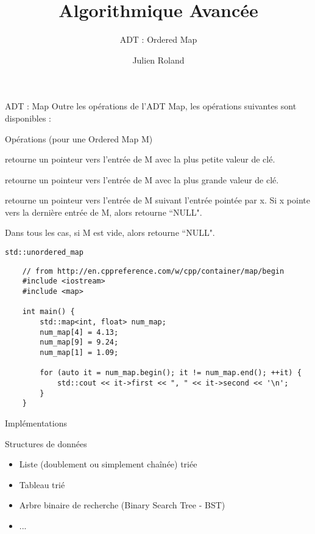 \documentclass{beamer}
\title{Algorithmique Avancée}
\subtitle{ADT : Ordered Map}
\author{Julien Roland}
\newcommand{\Op}[2]{\texttt{\underline{#1}#2}}
\begin{document}
\lstset{language=c++, basicstyle=\small, columns=fullflexible}


\maketitle


\begin{frame}{ADT : Map}
    Outre les opérations de l'ADT Map, les opérations suivantes sont disponibles :
\begin{block}{Opérations (pour une Ordered Map M)}
    \begin{description}[\Op{predecessor}{(M, x)} :]
        \item[\Op{min}{(M)} : ] retourne un pointeur vers l'entrée de M avec la plus petite valeur
            de clé. 
        \item[\Op{max}{(M)} : ] retourne un pointeur vers l'entrée de M avec la plus grande valeur
            de clé.
        \item[\Op{successor}{(M, x)} :] retourne un pointeur vers l'entrée de M suivant l'entrée
            pointée par x. Si x pointe vers la dernière entrée de M, alors retourne ``NULL".
        \item[\Op{predecessor}{(M, x)}]
    \end{description}
    Dans tous les cas, si M est vide, alors retourne ``NULL".
\end{block}
\end{frame}

\begin{frame}[fragile]{\texttt{std::unordered\_map}}
    \begin{lstlisting}
    // from http://en.cppreference.com/w/cpp/container/map/begin
    #include <iostream>
    #include <map>

    int main() {
        std::map<int, float> num_map;
        num_map[4] = 4.13;
        num_map[9] = 9.24;
        num_map[1] = 1.09;

        for (auto it = num_map.begin(); it != num_map.end(); ++it) {
            std::cout << it->first << ", " << it->second << '\n';
        }
    }
    \end{lstlisting}
\end{frame}

\begin{frame}{Implémentations}
    \begin{block}{Structures de données}
        \begin{itemize}
            \item Liste (doublement ou simplement chaînée) triée
            \item Tableau trié
            \item Arbre binaire de recherche (Binary Search Tree - BST)
            \item ...
        \end{itemize}
    \end{block}
\end{frame}
\end{document}
